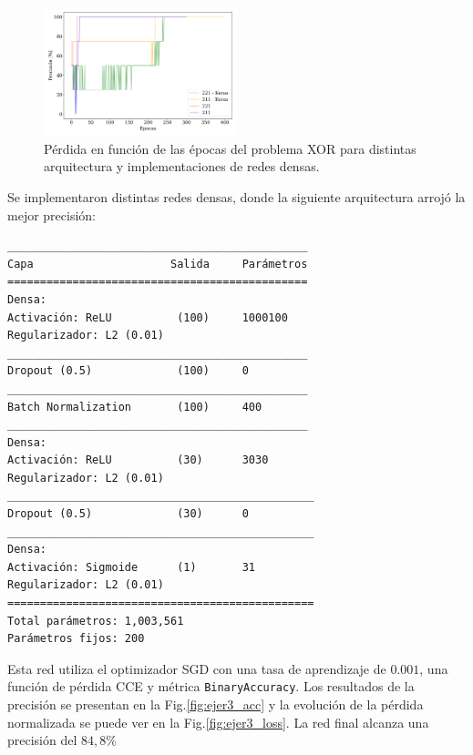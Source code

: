    \begin{figure}[H]
        \begin{small}
            \begin{center}
                \includegraphics[width=0.5\textwidth]{Graphs/ejer2_6_acc.pdf}
            \end{center}
            \caption{Pérdida en  función de las épocas del problema XOR para distintas arquitectura y implementaciones de redes densas.}
            \label{fig:ejer2-6-los}
        \end{small}
    \end{figure}





Se implementaron distintas redes densas, donde la siguiente arquitectura arrojó la mejor precisión:

\begin{verbatim}
______________________________________________
Capa                     Salida     Parámetros 
==============================================
Densa:
Activación: ReLU          (100)     1000100   
Regularizador: L2 (0.01)
______________________________________________
Dropout (0.5)             (100)     0         
______________________________________________
Batch Normalization       (100)     400       
______________________________________________
Densa:
Activación: ReLU          (30)      3030 
Regularizador: L2 (0.01)
_______________________________________________
Dropout (0.5)             (30)      0         
_______________________________________________
Densa:
Activación: Sigmoide      (1)       31        
Regularizador: L2 (0.01) 
===============================================
Total parámetros: 1,003,561
Parámetros fijos: 200
\end{verbatim}
Esta red utiliza el optimizador SGD con una tasa de aprendizaje de $0.001$, una función de pérdida CCE y métrica \verb|BinaryAccuracy|. Los resultados de la precisión se presentan en la Fig.\ref{fig:ejer3_acc} y la evolución de la pérdida normalizada se puede ver en la Fig.\ref{fig:ejer3_loss}. La red final alcanza una precisión del $84,8\%$

